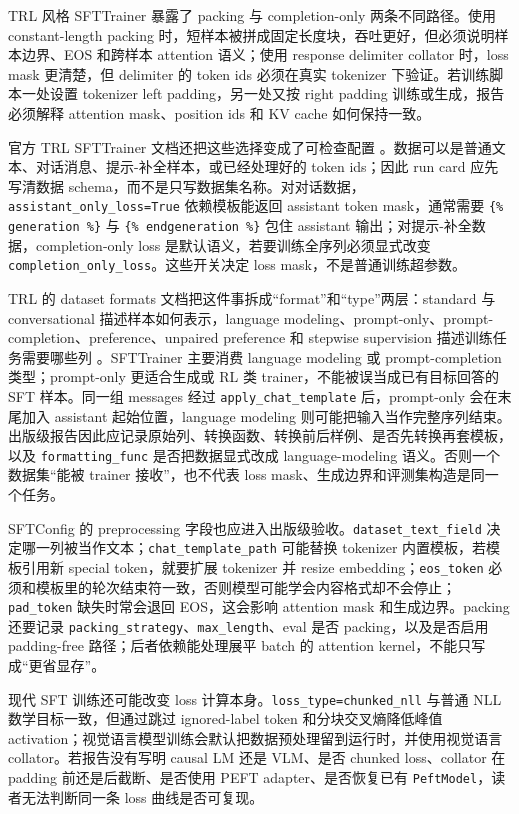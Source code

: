\documentclass[UTF8,zihao=-4,openany]{ctexbook}
\begin{document}
TRL 风格 SFTTrainer 暴露了 packing 与 completion-only 两条不同路径。使用 constant-length packing 时，短样本被拼成固定长度块，吞吐更好，但必须说明样本边界、EOS 和跨样本 attention 语义；使用 response delimiter collator 时，loss mask 更清楚，但 delimiter 的 token ids 必须在真实 tokenizer 下验证。若训练脚本一处设置 tokenizer left padding，另一处又按 right padding 训练或生成，报告必须解释 attention mask、position ids 和 KV cache 如何保持一致。

官方 TRL SFTTrainer 文档还把这些选择变成了可检查配置 \cite{huggingface2026trlsfttrainer}。数据可以是普通文本、对话消息、提示-补全样本，或已经处理好的 token ids；因此 run card 应先写清数据 schema，而不是只写数据集名称。对对话数据，\texttt{assistant\_only\_loss=True} 依赖模板能返回 assistant token mask，通常需要 \texttt{\{\% generation \%\}} 与 \texttt{\{\% endgeneration \%\}} 包住 assistant 输出；对提示-补全数据，completion-only loss 是默认语义，若要训练全序列必须显式改变 \texttt{completion\_only\_loss}。这些开关决定 loss mask，不是普通训练超参数。

TRL 的 dataset formats 文档把这件事拆成“format”和“type”两层：standard 与 conversational 描述样本如何表示，language modeling、prompt-only、prompt-completion、preference、unpaired preference 和 stepwise supervision 描述训练任务需要哪些列 \cite{huggingface2026trldatasetformats}。SFTTrainer 主要消费 language modeling 或 prompt-completion 类型；prompt-only 更适合生成或 RL 类 trainer，不能被误当成已有目标回答的 SFT 样本。同一组 messages 经过 \texttt{apply\_chat\_template} 后，prompt-only 会在末尾加入 assistant 起始位置，language modeling 则可能把输入当作完整序列结束。出版级报告因此应记录原始列、转换函数、转换前后样例、是否先转换再套模板，以及 \texttt{formatting\_func} 是否把数据显式改成 language-modeling 语义。否则一个数据集“能被 trainer 接收”，也不代表 loss mask、生成边界和评测集构造是同一个任务。

SFTConfig 的 preprocessing 字段也应进入出版级验收。\texttt{dataset\_text\_field} 决定哪一列被当作文本；\texttt{chat\_template\_path} 可能替换 tokenizer 内置模板，若模板引用新 special token，就要扩展 tokenizer 并 resize embedding；\texttt{eos\_token} 必须和模板里的轮次结束符一致，否则模型可能学会内容格式却不会停止；\texttt{pad\_token} 缺失时常会退回 EOS，这会影响 attention mask 和生成边界。packing 还要记录 \texttt{packing\_strategy}、\texttt{max\_length}、eval 是否 packing，以及是否启用 padding-free 路径；后者依赖能处理展平 batch 的 attention kernel，不能只写成“更省显存”。

现代 SFT 训练还可能改变 loss 计算本身。\texttt{loss\_type=chunked\_nll} 与普通 NLL 数学目标一致，但通过跳过 ignored-label token 和分块交叉熵降低峰值 activation；视觉语言模型训练会默认把数据预处理留到运行时，并使用视觉语言 collator。若报告没有写明 causal LM 还是 VLM、是否 chunked loss、collator 在 padding 前还是后截断、是否使用 PEFT adapter、是否恢复已有 \texttt{PeftModel}，读者无法判断同一条 loss 曲线是否可复现。
\end{document}
